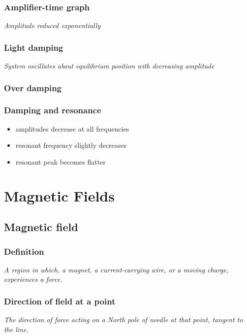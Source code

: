 \documentclass[a4paper,9pt]{scrartcl}
\begin{document}
    \subsubsection{Amplifier-time graph}
    \textit{Amplitude reduced exponentially}

    \subsubsection{Light damping}
    \textit{System oscillates about equilibrium position with decreasing amplitude}

    \subsubsection{Over damping}

    \subsubsection{Damping and resonance}
    \begin{itemize}
        \item amplitudes decrease at all frequencies
        \item resonant frequency slightly decreases
        \item resonant peak becomes flatter
    \end{itemize}


    \section{Magnetic Fields}

    \subsection{Magnetic field}

    \subsubsection{Definition}
    \textit{A region in which, a magnet, a current-carrying wire, or a moving charge, experiences a force.}

    \subsubsection{Direction of field at a point}
    \textit{The direction of force acting on a North pole of needle at that point, tangent to the line.}
\end{document}
